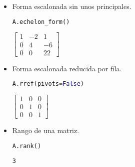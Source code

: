 \documentclass[a4,11pt]{aleph-notas}
\begin{document}
    
\begin{itemize}
\item
    Forma escalonada sin unos principales.
\begin{pycodigo}
    \begin{ipynbcodigo}\begin{lstlisting}[language=Python]
A.echelon_form()
    \end{lstlisting}\end{ipynbcodigo}
    \begin{ipynbsalida}[2mm]
$\displaystyle \left[\begin{matrix}1 & -2 & 1\\0 & 4 & -6\\0 & 0 & 22\end{matrix}\right]$
    \end{ipynbsalida}
\end{pycodigo}

\item
    Forma escalonada reducida por fila.
\begin{pycodigo}
    \begin{ipynbcodigo}\begin{lstlisting}[language=Python]
A.rref(pivots=False)
    \end{lstlisting}\end{ipynbcodigo}
    \begin{ipynbsalida}[2mm]
$\displaystyle \left[\begin{matrix}1 & 0 & 0\\0 & 1 & 0\\0 & 0 & 1\end{matrix}\right]$
    \end{ipynbsalida}
\end{pycodigo}

\item
    Rango de una matriz.
\begin{pycodigo}
    \begin{ipynbcodigo}\begin{lstlisting}[language=Python]
A.rank()
    \end{lstlisting}\end{ipynbcodigo}
    \begin{ipynbsalida}
\begin{Verbatim}
3
\end{Verbatim}
    \end{ipynbsalida}
\end{pycodigo}
\end{itemize}
\end{document}
